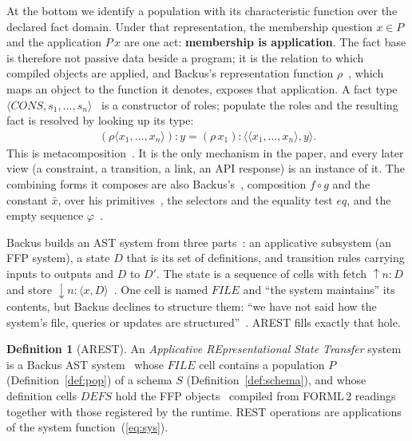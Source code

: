\documentclass[10pt,twocolumn]{article}
\theoremstyle{plain}
\theoremstyle{definition}
\newtheorem{definition}{Definition}
\begin{document}
At the bottom we identify a population with its characteristic function over the declared fact domain. Under that representation, the membership question $x \in P$ and the application $P\,x$ are one act: \textbf{membership is application}. The fact base is therefore not passive data beside a program; it is the relation to which compiled objects are applied, and Backus's representation function $\rho$~\cite[Sec.\,13.3]{backus78}, which maps an object to the function it denotes, exposes that application. A fact type $\langle\mathit{CONS}, s_1, \ldots, s_n\rangle$~\cite[Secs.\,11.2.4,\,13.3.2]{backus78} is a constructor of roles; populate the roles and the resulting fact is resolved by looking up its type:
\begin{align}
(\rho\langle x_1, \ldots, x_n\rangle)\!:\!y = (\rho\,x_1)\!:\!\langle\langle x_1, \ldots, x_n\rangle, y\rangle. \label{eq:metacomp}
\end{align}
This is metacomposition~\cite[Sec.\,13.3.2]{backus78}. It is the only mechanism in the paper, and every later view (a constraint, a transition, a link, an API response) is an instance of it. The combining forms it composes are also Backus's~\cite[Sec.\,11.2.4]{backus78}, composition $f\circ g$ and the constant $\bar{x}$, over his primitives~\cite[Sec.\,11.2.3]{backus78}, the selectors and the equality test $\mathit{eq}$, and the empty sequence $\varphi$~\cite[Sec.\,11.2.1]{backus78}.

\smallskip\noindent Backus builds an AST system from three parts~\cite[Sec.\,14.3]{backus78}: an applicative subsystem (an FFP system), a state $D$ that is its set of definitions, and transition rules carrying inputs to outputs and $D$ to $D'$. The state is a sequence of cells with fetch $\uparrow\!n\!:\!D$ and store $\downarrow\!n\!:\!\langle x, D\rangle$~\cite[Secs.\,13.3.4,\,14.3]{backus78}. One cell is named $\mathit{FILE}$ and ``the system maintains'' its contents, but Backus declines to structure them: ``we have not said how the system's file, queries or updates are structured''~\cite[Sec.\,14.4.4]{backus78}. AREST fills exactly that hole.

\begin{definition}[AREST]\label{def:arest}
An \emph{Applicative REpresentational State Transfer} system is a Backus AST system~\cite[Sec.\,14]{backus78} whose $\mathit{FILE}$ cell contains a population $P$ (Definition~\ref{def:pop}) of a schema $S$ (Definition~\ref{def:schema}), and whose definition cells $\mathit{DEFS}$ hold the FFP objects~\cite[Sec.\,13]{backus78} compiled from FORML\,2 readings together with those registered by the runtime. REST operations are applications of the system function~(\ref{eq:sys}).
\end{definition}
\end{document}
